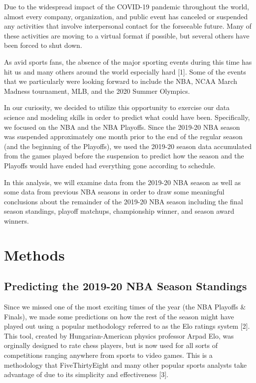 \documentclass[]{article}
\begin{document}
Due to the widespread impact of the COVID-19 pandemic throughout the
world, almost every company, organization, and public event has canceled
or suspended any activities that involve interpersonal contact for the
forseeable future. Many of these activities are moving to a virtual
format if possible, but several others have been forced to shut down.

As avid sports fans, the absence of the major sporting events during
this time has hit us and many others around the world especially hard
{[}1{]}. Some of the events that we particularly were looking forward to
include the NBA, NCAA March Madness tournament, MLB, and the 2020 Summer
Olympics.

In our curiosity, we decided to utilize this opportunity to exercise our
data science and modeling skills in order to predict what could have
been. Specifically, we focused on the NBA and the NBA Playoffs. Since
the 2019-20 NBA season was suspended approximately one month prior to
the end of the regular season (and the beginning of the Playoffs), we
used the 2019-20 season data accumulated from the games played before
the suspension to predict how the season and the Playoffs would have
ended had everything gone according to schedule.

In this analysis, we will examine data from the 2019-20 NBA season as
well as some data from previous NBA seasons in order to draw some
meaningful conclusions about the remainder of the 2019-20 NBA season
including the final season standings, playoff matchups, championship
winner, and season award winners.

\hypertarget{methods}{%
\section{Methods}\label{methods}}

\hypertarget{predicting-the-2019-20-nba-season-standings}{%
\subsection{Predicting the 2019-20 NBA Season
Standings}\label{predicting-the-2019-20-nba-season-standings}}

Since we missed one of the most exciting times of the year (the NBA
Playoffs \& Finals), we made some predictions on how the rest of the
season might have played out using a popular methodology referred to as
the Elo ratings system {[}2{]}. This tool, created by Hungarian-American
physics professor Arpad Elo, was orginally designed to rate chess
players, but is now used for all sorts of competitions ranging anywhere
from sports to video games. This is a methodology that FiveThirtyEight
and many other popular sports analysts take advantage of due to its
simplicity and effectiveness {[}3{]}.
\end{document}

